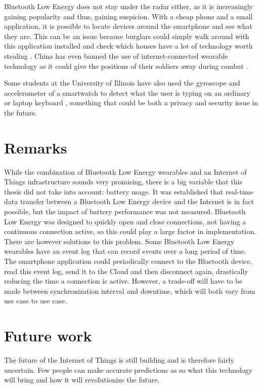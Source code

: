 \documentclass[pdftex,a4paper,12pt,twoside]{report}
\begin{document}
Bluetooth Low Energy does not stay under the radar either, as it is increasingly gaining popularity and thus, gaining suspicion. With a cheap phone and a small application, it is possible to locate devices around the smartphone and see what they are. This can be an issue because burglars could simply walk around with this application installed and check which houses have a lot of technology worth stealing \citep{ashford2015}. China has even banned the use of internet-connected wearable technology as it could give the positions of their soldiers away during combat \citep{bbcnews2015}.

Some students at the University of Illinois have also used the gyroscope and accelerometer of a smartwatch to detect what the user is typing on an ordinary or laptop keyboard \citep{wang2015mole}, something that could be both a privacy and security issue in the future.

\section{Remarks}
\label{sec:remarks}
While the combination of Bluetooth Low Energy wearables and an Internet of Things infrastructure sounds very promising, there is a big variable that this thesis did not take into account: battery usage. It was established that real-time data transfer between a Bluetooth Low Energy device and the Internet is in fact possible, but the impact of battery performance was not measured. Bluetooth Low Energy was designed to quickly open and close connections, not having a continuous connection active, so this could play a large factor in implementation. There are however solutions to this problem. Some Bluetooth Low Energy wearables have an event log that can record events over a long period of time. The smartphone application could periodically connect to the Bluetooth device, read this event log, send it to the Cloud and then disconnect again, drastically reducing the time a connection is active. However, a trade-off will have to be made between synchronization interval and downtime, which will both vary from use case to use case.

\section{Future work}
\label{sec:futurework}
The future of the Internet of Things is still building and is therefore fairly uncertain. Few people can make accurate predictions as so what this technology will bring and how it will revolutionize the future.
\end{document}
